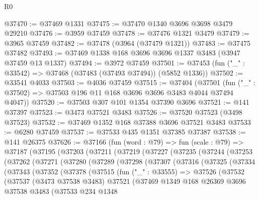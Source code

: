 \begin{lexlean}{R0}
\begin{coremodule}
@37470 := @37469 @1331
@37475 := @37470 @1340 @3696 @3698 @3479 @29210
@37476 := @3959 @37459
@37478 := @37476 @1321 @3479
@37479 := @3965 @37459
@37482 := @37478 (@3964 (@37479 @1321))
@37483 := @37475 @37482
@37493 := @37469 @1338 @168 @3696 @3696 @1337 @3483 (@3947 @37459 @13 @1337)
@37494 := @3972 @37459
@37501 := @37453 (fun ("_" : @33542) => @37468 (@37483 (@37493 @37494)) (@5852 @1336))
@37502 := @33541 @4033
@37503 := @4036 @37459
@37515 := @37404
    (@37501 (fun ("_" : @37502) => @37503 @196 @11 @168 @3696 @3696 @3483 @4044 @37494 @4047))
@37520 := @37503 @307 @101 @1354 @37390 @3696
@37521 := @141 @37397
@37523 := @3473 @37521 @3483
@37526 := @37520 @37523 (@3498 @37523)
@37532 := @37469 @1352 @168 @37388 @3696 @37521 @3483
@37533 := @6280 @37459
@37537 := @37533 @435 @1351 @37385 @37387
@37538 := @141 @26375
@37626 := @37166
    (fun (word : @79) =>
    fun (scale : @79) =>
    @37187
      (@37195
        (@37203
          (@37211
            (@37219
              (@37227
                (@37235
                  (@37244
                    (@37253
                      (@37262
                        (@37271
                          (@37280
                            (@37289
                              (@37298
                                (@37307
                                  (@37316
                                    (@37325
                                      (@37334
                                        (@37343
                                          (@37352
                                            (@37378
                                              (@37515
                                                (fun ("_" : @33555) =>
                                                @37526
                                                  (@37532
                                                    (@37537
                                                      (@3473 @37538 @3483)
                                                      @37521
                                                      (@37469
                                                        @1349
                                                        @168
                                                        @26369
                                                        @3696
                                                        @37538
                                                        @3483
                                                        (@37533
                                                          @234
                                                          @1348

\end{coremodule}
\end{lexlean}
